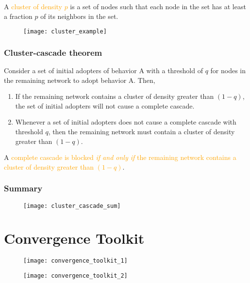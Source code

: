 A \textcolor{orange}{cluster of density $p$} is a set of nodes such that each node in the set has at least a fraction $p$ of its neighbors in the set.

\begin{figure}[H]
    \centering
    \texttt{[image: cluster\_example]}
\end{figure}

\subsection{Cluster-cascade theorem}

Consider a set of initial adopters of behavior A with a threshold of $q$ for nodes in the remaining network to adopt behavior A. Then,
\begin{enumerate}
\item If the remaining network contains a cluster of density greater than $(1-q)$, the set of initial adopters will not cause a complete cascade.
\item Whenever a set of initial adopters does not cause a complete cascade with threshold $q$, then the remaining network must contain a cluster of density greater than $(1-q)$.
\end{enumerate}
A \textcolor{orange}{complete cascade is blocked \textit{if and only if} the remaining network contains a cluster of density greater than $(1-q)$}.

\subsection{Summary}

\begin{figure}[H]
    \centering
    \texttt{[image: cluster\_cascade\_sum]}
\end{figure}

\chapter{Convergence Toolkit}

\begin{figure}[H]
    \centering
    \texttt{[image: convergence\_toolkit\_1]}
\end{figure}

\begin{figure}[H]
    \centering
    \texttt{[image: convergence\_toolkit\_2]}
\end{figure}
